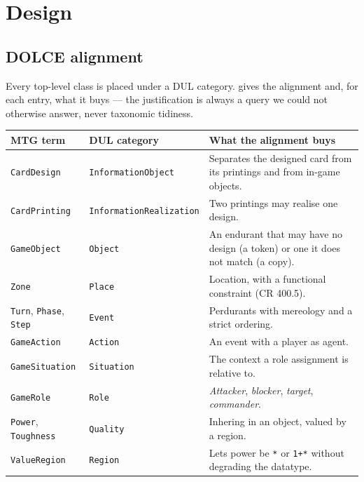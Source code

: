 \documentclass[11pt,a4paper]{article}
\begin{document}
\section{Design}
\label{sec:design}

\subsection{DOLCE alignment}

Every top-level class is placed under a DUL category.  gives the alignment and, for each entry, what it buys --- the justification is always a query we could not otherwise answer, never taxonomic tidiness.

\begin{table}[t]
\centering
\small
\setlength{\tabcolsep}{4pt}
\begin{tabular}{@{}p{} p{} p{}@{}}
\toprule
\textbf{MTG term} & \textbf{DUL category} & \textbf{What the alignment buys} \\
\midrule
\texttt{CardDesign} & \texttt{InformationObject} & Separates the designed card from its printings and from in-game objects. \\
\texttt{CardPrinting} & \texttt{Information\allowbreak{}Realization} & Two printings may realise one design. \\
\texttt{GameObject} & \texttt{Object} & An endurant that may have no design (a token) or one it does not match (a copy). \\
\texttt{Zone} & \texttt{Place} & Location, with a functional constraint (CR 400.5). \\
\texttt{Turn}, \texttt{Phase}, \texttt{Step} & \texttt{Event} & Perdurants with mereology and a strict ordering. \\
\texttt{GameAction} & \texttt{Action} & An event with a player as agent. \\
\texttt{GameSituation} & \texttt{Situation} & The context a role assignment is relative to. \\
\texttt{GameRole} & \texttt{Role} & \emph{Attacker}, \emph{blocker}, \emph{target}, \emph{commander}. \\
\texttt{Power}, \texttt{Toughness} & \texttt{Quality} & Inhering in an object, valued by a region. \\
\texttt{ValueRegion} & \texttt{Region} & Lets power be \texttt{*} or \texttt{1+*} without degrading the datatype. \\

\end{tabular}
\end{table}
\end{document}
